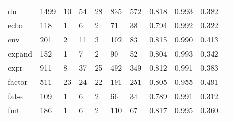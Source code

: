 \begin{longtable}{lp{1.10cm}p{1.10cm}p{1.10cm}p{1.10cm}p{1.10cm}p{1.10cm}p{1.10cm}p{1.10cm}p{1.10cm}p{1.10cm}}
du        &                   1499 &                                 10 &                                54 &                               28 &                               835 &                             572 &                             0.818 &                                 0.993 &                               0.382 \\
echo      &                    118 &                                  1 &                                 6 &                                2 &                                71 &                              38 &                             0.794 &                                 0.992 &                               0.322 \\
env       &                    201 &                                  2 &                                11 &                                3 &                               102 &                              83 &                             0.815 &                                 0.990 &                               0.413 \\
expand    &                    152 &                                  1 &                                 7 &                                2 &                                90 &                              52 &                             0.804 &                                 0.993 &                               0.342 \\
expr      &                    911 &                                  8 &                                37 &                               25 &                               492 &                             349 &                             0.812 &                                 0.991 &                               0.383 \\
factor    &                    511 &                                 23 &                                24 &                               22 &                               191 &                             251 &                             0.805 &                                 0.955 &                               0.491 \\
false     &                    109 &                                  1 &                                 6 &                                2 &                                66 &                              34 &                             0.789 &                                 0.991 &                               0.312 \\
fmt       &                    186 &                                  1 &                                 6 &                                2 &                               110 &                              67 &                             0.817 &                                 0.995 &                               0.360 \\

\end{longtable}

